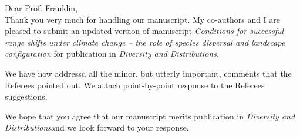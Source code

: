 \documentclass[11pt,stdletter,letterpaper]{newlfm}
\newcommand{\mytitle}{\emph{Conditions for successful range shifts under climate change -- the role of species dispersal and landscape configuration }}
\newcommand{\myjournal}{\emph{Diversity and Distributions}}
\begin{document}
\begin{newlfm}
Dear Prof. Franklin,\\

Thank you very much for handling our manuscript. My co-authors and I are pleased to submit an updated version of manuscript \mytitle for publication in \myjournal. 

 We have now addressd all the minor, but utterly important, comments that the Referees pointed out. We attach point-by-point response to the Referees suggestions.

We hope that you agree that our manuscript merits publication in \myjournal and we look forward to your response.



\end{newlfm}
\end{document}
